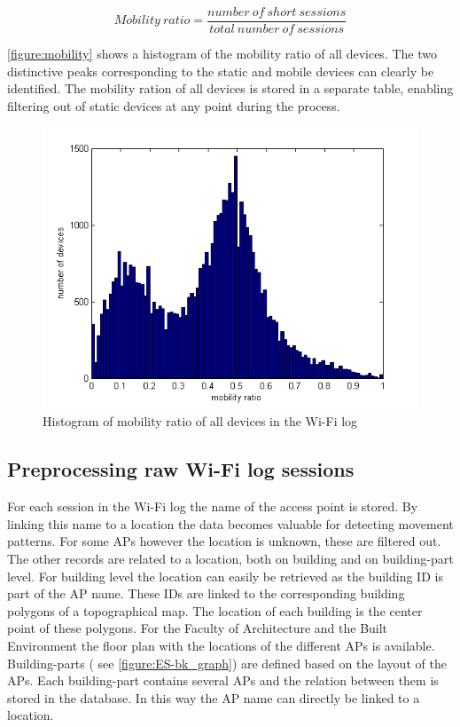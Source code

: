 \[
    Mobility\ ratio = \frac{number\ of\ short\ sessions}{total\ number\ of\ sessions}
\] 

\autoref{figure:mobility} shows a histogram of the mobility ratio of all devices. The two distinctive peaks corresponding to the static and mobile devices can clearly be identified. The mobility ration of all devices is stored in a separate table, enabling filtering out of static devices at any point during the process.

\begin{figure}[H]
\centering
\includegraphics[scale=0.4]{mobility.png}
\captionsetup{justification=centering}
\caption{Histogram of mobility ratio of all devices in the Wi-Fi log}
\label{figure:ES-mobility}
\end{figure}

\subsection{Preprocessing raw Wi-Fi log sessions}\label{ES-preprocessing}
For each session in the Wi-Fi log the name of the access point is stored. By linking this name to a location the data becomes valuable for detecting movement patterns. For some APs however the location is unknown, these are filtered out. The other records are related to a location, both on building and on building-part level. For building level the location can easily be retrieved as the building ID is part of the AP name. These IDs are linked to the corresponding building polygons of a topographical map. The location of each building is the center point of these polygons. For the Faculty of Architecture and the Built Environment the floor plan with the locations of the different APs is available. Building-parts ( see \autoref{figure:ES-bk_graph}) are defined based on the layout of the APs. Each building-part contains several APs and the relation between them is stored in the database. In this way the AP name can directly be linked to a location.  

